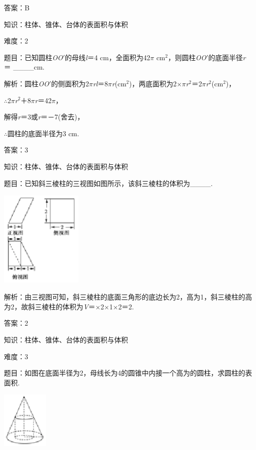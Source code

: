 \documentclass{article} %
\begin{document}
答案：B


知识：柱体、锥体、台体的表面积与体积

难度：2

题目：已知圆柱\textit{OO}$'$的母线\textit{l}＝4 cm，全面积为42$\pi$ cm${}^{2}$，则圆柱\textit{OO}$'$的底面半径\textit{r}＝ \_\_\_\_cm.

解析：圆柱\textit{OO}$'$的侧面积为2$\pi$\textit{rl}＝8$\pi$\textit{r}(cm${}^{2}$)，两底面积为2$\mathrm{\times}$$\pi$\textit{r}${}^{2}$＝2$\pi$\textit{r}${}^{2}$(cm${}^{2}$)，

$\mathrm{\therefore}$2$\pi$\textit{r}${}^{2}$＋8$\pi$\textit{r}＝42$\pi$，

解得\textit{r}＝3或\textit{r}＝－7(舍去)，

$\mathrm{\therefore}$圆柱的底面半径为3 cm.

答案：3

知识：柱体、锥体、台体的表面积与体积

题目：已知斜三棱柱的三视图如图所示，该斜三棱柱的体积为\_\_\_\_.

\includegraphics*[width=1.57in, height=1.86in, keepaspectratio=false]{image72}

解析：由三视图可知，斜三棱柱的底面三角形的底边长为2，高为1，斜三棱柱的高为2，故斜三棱柱的体积为\textit{V}＝$\mathrm{\times}$2$\mathrm{\times}$1$\mathrm{\times}$2＝2.

答案：2

知识：柱体、锥体、台体的表面积与体积

难度：3

题目：如图在底面半径为2，母线长为4的圆锥中内接一个高为的圆柱，求圆柱的表面积.



\includegraphics*[width=0.89in, height=1.10in, keepaspectratio=false]{image73}
\end{document}
